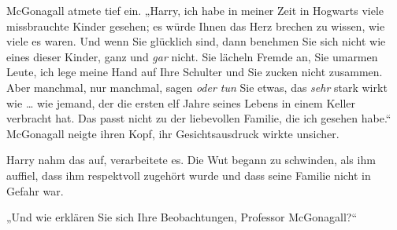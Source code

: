 McGonagall atmete tief ein.
„Harry, ich habe in meiner Zeit in Hogwarts viele missbrauchte Kinder gesehen; es würde Ihnen das Herz brechen zu wissen, wie viele es waren. Und wenn Sie glücklich sind, dann benehmen Sie sich nicht wie eines dieser Kinder, ganz und \emph{gar} nicht. Sie lächeln Fremde an, Sie umarmen Leute, ich lege meine Hand auf Ihre Schulter und Sie zucken nicht zusammen. Aber manchmal, nur manchmal, sagen \emph{oder tun} Sie etwas, das \emph{sehr} stark wirkt wie … wie jemand, der die ersten elf Jahre seines Lebens in einem Keller verbracht hat. Das passt nicht zu der liebevollen Familie, die ich gesehen habe.“ McGonagall neigte ihren Kopf, ihr Gesichtsausdruck wirkte unsicher.

Harry nahm das auf, verarbeitete es. Die Wut begann zu schwinden, als ihm auffiel, dass ihm respektvoll zugehört wurde und dass seine Familie nicht in Gefahr war.

„Und wie erklären Sie sich Ihre Beobachtungen, Professor McGonagall?“

